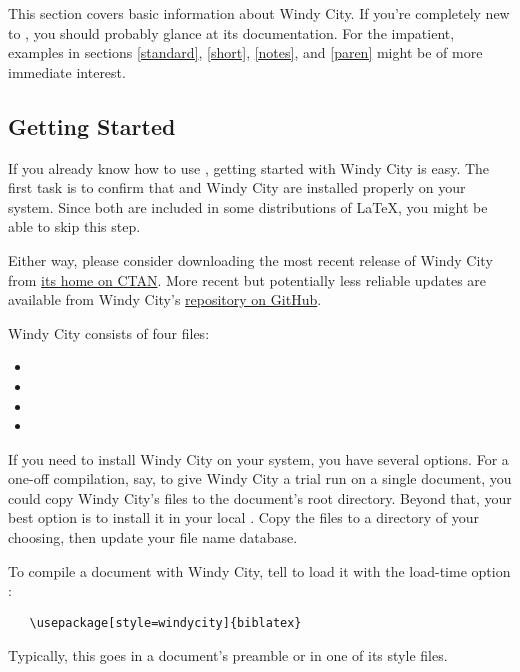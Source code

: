 \documentclass[11pt,letterpaper,oneside]{article}
\begin{document}
This section covers basic information about Windy City. If you're
completely new to \biblatex, you should probably glance at its
documentation. For the impatient, examples in sections \ref{standard},
\ref{short}, \ref{notes}, and \ref{paren} might be of more immediate
interest.

\subsection{Getting Started}

If you already know how to use \biblatex, getting started with Windy
City is easy. The first task is to confirm that \biblatex and Windy
City are installed properly on your system. Since both are included in
some distributions of \LaTeX, you might be able to skip this step.

Either way, please consider downloading the most recent release of
Windy City from \begingroup \hypersetup{urlcolor=blue}
\href{https://www.ctan.org/pkg/windycity}{its home on CTAN}. More
recent but potentially less reliable updates are available from Windy
City's \href{https://github.com/brianchase/windycity}{repository on
GitHub}.\endgroup

Windy City consists of four files:

\begin{itemize}[before=\small]
\item {}
\item {}
\item {}
\item {}
\end{itemize}

If you need to install Windy City on your system, you have several
options. For a one-off compilation, say, to give Windy City a trial
run on a single document, you could copy Windy City's files to the
document's root directory. Beyond that, your best option is to install
it in your local . Copy the files to a directory of your
choosing, then update your  file name database.

To compile a document with Windy City, tell \biblatex to load it with
the load-time option :

\begin{verbatim}
   \usepackage[style=windycity]{biblatex}
\end{verbatim}

\noindent Typically, this goes in a document's preamble or in one of
its style files.
\end{document}
